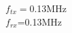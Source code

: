 \documentclass[preview]{standalone}
\begin{document}
\begin{center}
$f_{tx}=$0.13MHz\\$f_{rx}$=0.13MHz
\end{center}
\end{document}

